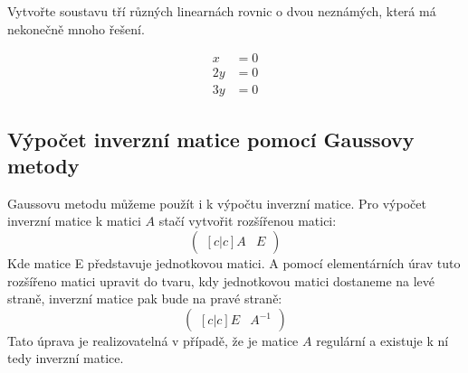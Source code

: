 \begin{example}
    Vytvořte soustavu tří různých linearnách rovnic o dvou neznámých, která má
    nekonečně mnoho řešení.

    \begin{align*}
        x &= 0\\
        2y &= 0\\
        3y &= 0
    \end{align*}
\end{example}


\subsection{Výpočet inverzní matice pomocí Gaussovy metody}
Gaussovu metodu můžeme použít i k výpočtu inverzní matice. Pro výpočet
inverzní matice k matici $A$ stačí vytvořit rozšířenou matici:
\[
    \begin{pmatrix}[c|c]
    A & E
    \end{pmatrix}
\]
Kde matice E představuje jednotkovou matici. A pomocí elementárních úrav tuto rozšířeno
matici upravit do tvaru, kdy jednotkovou matici dostaneme na levé straně, inverzní
matice pak bude na pravé straně:
\[
    \begin{pmatrix}[c|c]
        E & A^{-1}
        \end{pmatrix}
\]
Tato úprava je realizovatelná v případě, že je matice $A$ regulární a existuje k ní tedy inverzní
matice.

